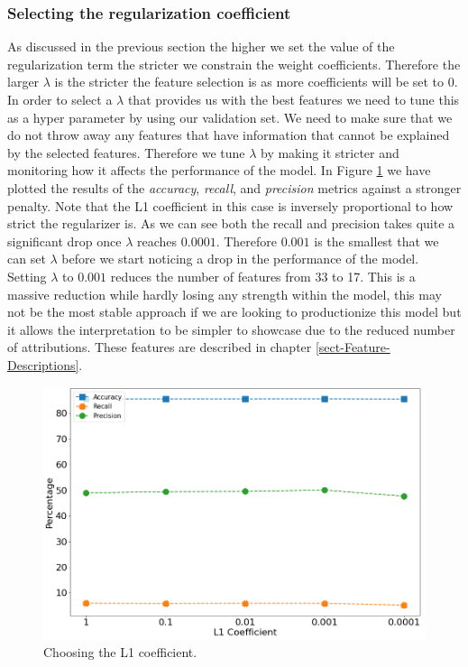 \subsubsection{Selecting the regularization coefficient}
As discussed in the previous section the higher we set the value of the regularization term the stricter we constrain the weight coefficients. Therefore the larger $\lambda$ is the stricter the feature selection is as more coefficients will be set to 0. In order to select a $\lambda$ that provides us with the best features we need to tune this as a hyper parameter by using our validation set. We need to make sure that we do not throw away any features that have information that cannot be explained by the selected features. Therefore we tune $\lambda$ by making it stricter and monitoring how it affects the performance of the model. In Figure \ref{fig-regularizer} we have plotted the results of the \emph{accuracy}, \emph{recall}, and \emph{precision} metrics against a stronger penalty. Note that the L1 coefficient in this case is inversely proportional to how strict the regularizer is. As we can see both the recall and precision takes quite a significant drop once $\lambda$ reaches $0.0001$. Therefore $0.001$ is the smallest that we can set $\lambda$ before we start noticing a drop in the performance of the model. Setting $\lambda$ to $0.001$ reduces the number of features from 33 to 17. This is a massive reduction while hardly losing any strength within the model, this may not be the most stable approach if we are looking to productionize this model but it allows the interpretation to be simpler to showcase due to the reduced number of attributions. These features are described in chapter \ref{sect-Feature-Descriptions}.
\begin  {figure}[!htpb]
\centering
  \includegraphics[width=\linewidth]{Credit_Images/Regularizer.png}
   \caption{Choosing the L1 coefficient.}
    \label{fig-regularizer}
\end{figure}

